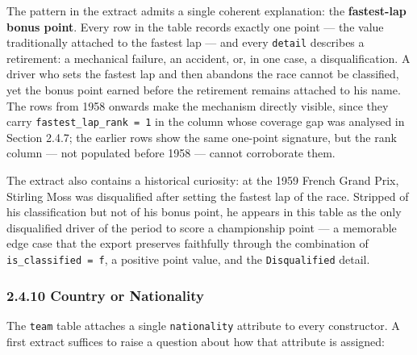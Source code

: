 \documentclass[
]{article}
\begin{document}
The pattern in the extract admits a single coherent explanation: the
\textbf{fastest-lap bonus point}. Every row in the table records exactly
one point --- the value traditionally attached to the fastest lap ---
and every \texttt{detail} describes a retirement: a mechanical failure,
an accident, or, in one case, a disqualification. A driver who sets the
fastest lap and then abandons the race cannot be classified, yet the
bonus point earned before the retirement remains attached to his name.
The rows from 1958 onwards make the mechanism directly visible, since
they carry \texttt{fastest\_lap\_rank\ =\ 1} in the column whose
coverage gap was analysed in Section 2.4.7; the earlier rows show the
same one-point signature, but the rank column --- not populated before
1958 --- cannot corroborate them.

The extract also contains a historical curiosity: at the 1959 French
Grand Prix, Stirling Moss was disqualified after setting the fastest lap
of the race. Stripped of his classification but not of his bonus point,
he appears in this table as the only disqualified driver of the period
to score a championship point --- a memorable edge case that the export
preserves faithfully through the combination of
\texttt{is\_classified\ =\ f}, a positive point value, and the
\texttt{Disqualified} detail.

\subsubsection{2.4.10 Country or
Nationality}\label{country-or-nationality}

The \texttt{team} table attaches a single \texttt{nationality} attribute
to every constructor. A first extract suffices to raise a question about
how that attribute is assigned:

\begin{table}[!h]
\centering\begingroup\fontsize{8}{10}\selectfont

\endgroup{}
\end{table}
\end{document}
